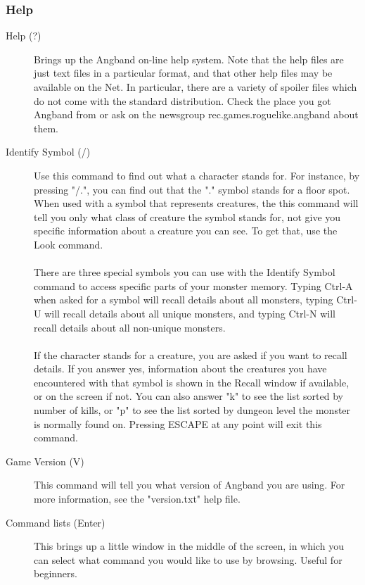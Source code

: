 \subsubsection{Help}
\begin{description}
\item[Help (?)]
  Brings up the Angband on-line help system. Note that the help files are
  just text files in a particular format, and that other help files may be
  available on the Net. In particular, there are a variety of spoiler
  files which do not come with the standard distribution. Check the place
  you got Angband from or ask on the newsgroup rec.games.roguelike.angband
  about them.

\item[Identify Symbol (/)]
  Use this command to find out what a character stands for. For instance,
  by pressing "/.", you can find out that the "." symbol stands for a
  floor spot. When used with a symbol that represents creatures, the this
  command will tell you only what class of creature the symbol stands for,
  not give you specific information about a creature you can see. To get
  that, use the Look command.

\paragraph{}
There are three special symbols you can use with the Identify Symbol
command to access specific parts of your monster memory.  Typing Ctrl-A
when asked for a symbol will recall details about all monsters, typing
Ctrl-U will recall details about all unique monsters, and typing Ctrl-N
will recall details about all non-unique monsters.

\paragraph{}
If the character stands for a creature, you are asked if you want to
recall details. If you answer yes, information about the creatures you
have encountered with that symbol is shown in the Recall window if
available, or on the screen if not. You can also answer "k" to see the
list sorted by number of kills, or "p" to see the list sorted by dungeon
level the monster is normally found on. Pressing ESCAPE at any point will
exit this command.

\item[Game Version (V)]
  This command will tell you what version of Angband you are using.  For
  more information, see the "version.txt" help file.

\item[Command lists (Enter)]
  This brings up a little window in the middle of the screen, in which you
  can select what command you would like to use by browsing.  Useful for
  beginners.
\end{description}

